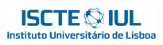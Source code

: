
\begin{titlepage}
\begin{center}
\includegraphics[width=5cm]{images/iscte_iul_cor}~\\
\end{center}
%
\if{}
  \vspace*{\finalLogoSpacing}
\else
  \vspace*{\draftLogoSpacing}
\fi

\begin{center}
{\LARGE \textbf{\Department}}\\[1.0cm]

{\LARGE \textbf{\Title}}\\[1.0cm]

{\Large \Subtitle}\\[1.0cm]

{\Large \textbf{\StudentName}}\\[1.0cm]


\end{center}
\end{titlepage}
